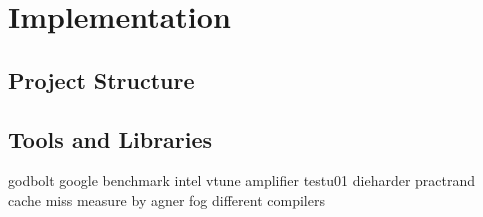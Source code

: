 \documentclass[crop=false]{standalone}
\begin{document}
  \section{Implementation} %
  \label{sec:implementation}
    \subsection{Project Structure} %
    \label{sub:project_structure}

    \subsection{Tools and Libraries} %
    \label{sub:tools_and_libraries}
      godbolt
      google benchmark
      intel vtune amplifier
      testu01
      dieharder
      practrand
      cache miss measure by agner fog
      different compilers
\end{document}
